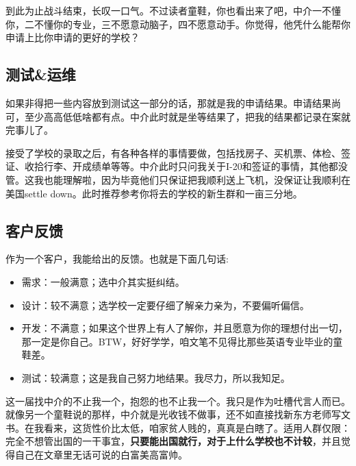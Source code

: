 到此为止战斗结束，长叹一口气。不过读者童鞋，你也看出来了吧，中介一不懂你，二不懂你的专业，三不愿意动脑子，四不愿意动手。你觉得，他凭什么能帮你申请上比你申请的更好的学校？

\subsection{测试\&运维}

如果非得把一些内容放到测试这一部分的话，那就是我的申请结果。申请结果尚可，至少高高低低啥都有点。中介此时就是坐等结果了，把我的结果都记录在案就完事儿了。\par
接受了学校的录取之后，有各种各样的事情要做，包括找房子、买机票、体检、签证、收拾行李、开成绩单等等。中介此时只问我关于I-20和签证的事情，其他都没管。这我也能理解啦，因为毕竟他们只保证把我顺利送上飞机，没保证让我顺利在美国settle down。此时推荐参考你将去的学校的新生群和一亩三分地。

\subsection{客户反馈}

作为一个客户，我能给出的反馈。也就是下面几句话:
\begin{itemize}
\item 需求：一般满意；选中介其实挺纠结。
\item 设计：较不满意；选学校一定要仔细了解亲力亲为，不要偏听偏信。
\item 开发：不满意；如果这个世界上有人了解你，并且愿意为你的理想付出一切，那一定是你自己。BTW，好好学学，咱文笔不见得比那些英语专业毕业的童鞋差。
\item 测试：较满意；这是我自己努力地结果。我尽力，所以我知足。
\end{itemize}

这一届找中介的不止我一个，抱怨的也不止我一个。我只是作为吐槽代言人而已。就像另一个童鞋说的那样，中介就是光收钱不做事，还不如直接找新东方老师写文书。在我看来，这货性价比太低，咱家贫人贱的，真真是白瞎了。适用人群仅限：完全不想管出国的一干事宜，\textbf{只要能出国就行，对于上什么学校也不计较}，并且觉得自己在文章里无话可说的白富美高富帅。\par

